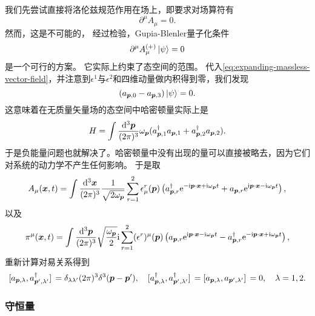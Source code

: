 我们先尝试直接将洛伦兹规范作用在场上，即要求对场算符有
\[
    \partial^\mu A_\mu = 0.
\]
然而，这是不可能的，
经过检验，Gupia-Blenler量子化条件
\begin{equation}
    \partial^\mu {A}_\mu^{(+)} \ket{\psi} = 0
    \label{eq:gupia-blenlder}
\end{equation}
是一个可行的方案。
它实际上约束了态空间的范围。
代入\eqref{eq:expanding-massless-vector-field}，并注意到$\epsilon^1$与$\epsilon^2$和四维动量做内积得到零，我们发现
\begin{equation}
    ({a}_{\vb*{p}, 0} - {a}_{\vb*{p}, 3}) \ket{\psi} = 0.
\end{equation}
这意味着在无质量矢量场的态空间中哈密顿量实际上是
\begin{equation}
    {H} = \int \frac{\dd[3]{\vb*{p}}}{(2\pi)^3} \omega_{\vb*{p}} ({a}_{\vb*{p},1}^\dagger {a}_{\vb*{p}, 1} + {a}_{\vb*{p},2}^\dagger {a}_{\vb*{p}, 2}).
\end{equation}
于是负能量问题也就解决了。哈密顿量中没有出现的量可以直接被略去，因为它们对系统的动力学不产生任何影响。
于是取
\begin{equation}
    A_\mu (\vb*{x}, t) = \int \frac{\dd[3]{\vb*{x}}}{(2\pi)^3} \frac{1}{\sqrt{2 \omega_{\vb*{p}}}} \sum_{r=1}^2 \epsilon_\mu^r(\vb*{p}) \left({a}_{\vb*{p}, r}^\dagger \mathrm{e}^{ - \mathrm{i} \vb*{p} \cdot \vb*{x} + \mathrm{i} \omega_{\vb*{p}} t} + {a}_{\vb*{p}, r} \mathrm{e}^{ \mathrm{i} \vb*{p} \cdot \vb*{x} - \mathrm{i} \omega_{\vb*{p}} t} \right),
\end{equation}
以及
\begin{equation}
    \pi^\mu (\vb*{x}, t) = \int \frac{\dd[3]{\vb*{p}}}{(2\pi)^3} \sqrt{\frac{\omega_{\vb*{p}}}{2}} \mathrm{i} \sum_{r=1}^2 (\epsilon^r)^\mu (\vb*{p}) \left( {a}_{\vb*{p}, r} \mathrm{e}^{\mathrm{i} \vb*{p} \cdot \vb*{x} - \mathrm{i} \omega_{\vb*{p}} t} - {a}_{\vb*{p}, r}^\dagger \mathrm{e}^{ - \mathrm{i} \vb*{p} \cdot \vb*{x} + \mathrm{i} \omega_{\vb*{p}} t} \right),
\end{equation}
重新计算对易关系得到
\begin{equation}
    \comm*{{a}_{\vb*{p}, \lambda}}{{a}^\dagger_{\vb*{p}', \lambda'}} = \delta_{\lambda \lambda'} (2\pi)^3 \delta^3(\vb*{p} - \vb*{p}'), \quad \comm*{{a}^\dagger_{\vb*{p}, \lambda}}{{a}^\dagger_{\vb*{p}', \lambda'}} = \comm*{{a}_{\vb*{p}, \lambda}}{{a}_{\vb*{p}', \lambda'}} = 0, \quad \lambda = 1, 2.
\end{equation}

\subsubsection{守恒量}

